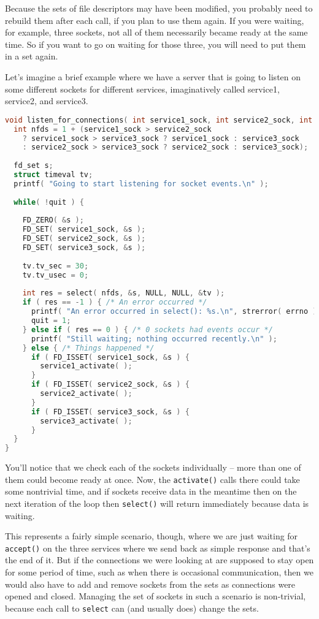 Because the sets of file descriptors may have been modified, you probably need to rebuild them after each call, if you plan to use them again. If you were waiting, for example, three sockets, not all of them necessarily became ready at the same time. So if you want to go on waiting for those three, you will need to put them in a set again.

Let's imagine a brief example where we have a server that is going to listen on some different sockets for different services, imaginatively called service1, service2, and service3.

\begin{lstlisting}[language=C]
void listen_for_connections( int service1_sock, int service2_sock, int service3_sock ) {
  int nfds = 1 + (service1_sock > service2_sock
    ? service1_sock > service3_sock ? service1_sock : service3_sock
    : service2_sock > service3_sock ? service2_sock : service3_sock);
    
  fd_set s;
  struct timeval tv;
  printf( "Going to start listening for socket events.\n" );
  
  while( !quit ) {
  
    FD_ZERO( &s );
    FD_SET( service1_sock, &s );
    FD_SET( service2_sock, &s );
    FD_SET( service3_sock, &s );
    
    tv.tv_sec = 30;
    tv.tv_usec = 0;
  
    int res = select( nfds, &s, NULL, NULL, &tv );
    if ( res == -1 ) { /* An error occurred */
      printf( "An error occurred in select(): %s.\n", strerror( errno ) );
      quit = 1;
    } else if ( res == 0 ) { /* 0 sockets had events occur */
      printf( "Still waiting; nothing occurred recently.\n" );
    } else { /* Things happened */
      if ( FD_ISSET( service1_sock, &s ) {
        service1_activate( ); 
      }
      if ( FD_ISSET( service2_sock, &s ) {
        service2_activate( ); 
      }
      if ( FD_ISSET( service3_sock, &s ) {
        service3_activate( ); 
      }
  }
}
\end{lstlisting}

You'll notice that we check each of the sockets individually -- more than one of them could become ready at once. Now, the \texttt{activate()} calls there could take some nontrivial time, and if sockets receive data in the meantime then on the next iteration of the loop then \texttt{select()} will return immediately because data is waiting.

This represents a fairly simple scenario, though, where we are just waiting for \texttt{accept()} on the three services where we send back as simple response and that's the end of it. But if the connections we were looking at are supposed to stay open for some period of time, such as when there is occasional communication, then we would also have to add and remove sockets from the sets as connections were opened and closed. Managing the set of sockets in such a scenario is non-trivial, because each call to \texttt{select} can (and usually does) change the sets.

